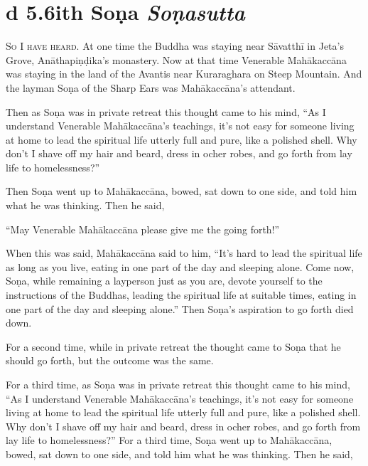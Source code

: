 \documentclass[12pt,openany]{book}%
\newcommand*{\suttatitleacronym}[1]{\smaller[2]{#1}\vspace*{.3em}}
\newcommand*{\suttatitletranslation}[1]{\linebreak{#1}}
\newcommand*{\suttatitleroot}[1]{\linebreak\smaller[2]\itshape{#1}}
\newcommand*{\tocacronym}[1]{\hspace*{-3.3em}{#1}\quad}
\newcommand*{\toctranslation}[1]{#1}
\newcommand*{\tocroot}[1]{(\textit{#1})}
\newcommand*{\scevam}[1]{\textsc{#1}}
\begin{document}
%
\section*{{\suttatitleacronym Ud 5.6}{\suttatitletranslation With Soṇa }{\suttatitleroot Soṇasutta}}
\addcontentsline{toc}{section}{\tocacronym{Ud 5.6} \toctranslation{With Soṇa } \tocroot{Soṇasutta}}

\scevam{So I have heard. }At one time the Buddha was staying near \textsanskrit{Sāvatthī} in Jeta’s Grove, \textsanskrit{Anāthapiṇḍika}’s monastery. Now at that time Venerable \textsanskrit{Mahākaccāna} was staying in the land of the Avantis near Kuraraghara on Steep Mountain. And the layman \textsanskrit{Soṇa} of the Sharp Ears was \textsanskrit{Mahākaccāna}’s attendant. 

Then as \textsanskrit{Soṇa} was in private retreat this thought came to his mind, “As I understand Venerable \textsanskrit{Mahākaccāna}’s teachings, it’s not easy for someone living at home to lead the spiritual life utterly full and pure, like a polished shell. Why don’t I shave off my hair and beard, dress in ocher robes, and go forth from lay life to homelessness?” 

Then \textsanskrit{Soṇa} went up to \textsanskrit{Mahākaccāna}, bowed, sat down to one side, and told him what he was thinking. Then he said, 

“May Venerable \textsanskrit{Mahākaccāna} please give me the going forth!” 

When this was said, \textsanskrit{Mahākaccāna} said to him, “It’s hard to lead the spiritual life as long as you live, eating in one part of the day and sleeping alone. Come now, \textsanskrit{Soṇa}, while remaining a layperson just as you are, devote yourself to the instructions of the Buddhas, leading the spiritual life at suitable times, eating in one part of the day and sleeping alone.” Then \textsanskrit{Soṇa}’s aspiration to go forth died down. 

For a second time, while in private retreat the thought came to \textsanskrit{Soṇa} that he should go forth, but the outcome was the same. 

For a third time, as \textsanskrit{Soṇa} was in private retreat this thought came to his mind, “As I understand Venerable \textsanskrit{Mahākaccāna}’s teachings, it’s not easy for someone living at home to lead the spiritual life utterly full and pure, like a polished shell. Why don’t I shave off my hair and beard, dress in ocher robes, and go forth from lay life to homelessness?” For a third time, \textsanskrit{Soṇa} went up to \textsanskrit{Mahākaccāna}, bowed, sat down to one side, and told him what he was thinking. Then he said, 
\end{document}

